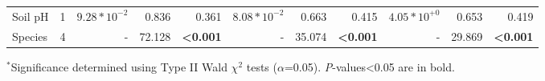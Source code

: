 \begin{landscape}
\begin{table}[]
{\begin{tabular}{p{2.5cm}p{0.5cm}p{2cm}p{1.5cm}p{1.5cm}p{2cm}p{1.5cm}p{1.5cm}p{2cm}p{1.5cm}p{1.5cm}}
                 Soil pH & \multicolumn{1}{r}{1}
                 & \multicolumn{1}{r}{$9.28*10^{-2}$} & \multicolumn{1}{r}{0.836} & \multicolumn{1}{r}{0.361}
                 & \multicolumn{1}{r}{$8.08*10^{-2}$} & \multicolumn{1}{r}{0.663} & \multicolumn{1}{r}{0.415}
                 & \multicolumn{1}{r}{$4.05*10^{+0}$} & \multicolumn{1}{r}{0.653} & \multicolumn{1}{r}{0.419} 
                 \\

                 Species & \multicolumn{1}{r}{4}
                 & \multicolumn{1}{r}{-} & \multicolumn{1}{r}{72.128} &  \multicolumn{1}{r}{\textbf{\textless{}0.001}}
                 & \multicolumn{1}{r}{-} & \multicolumn{1}{r}{35.074} &  \multicolumn{1}{r}{\textbf{\textless{}0.001}}
                 & \multicolumn{1}{r}{-} & \multicolumn{1}{r}{29.869} &  \multicolumn{1}{r}{\textbf{\textless{}0.001}}
                 \\
                 \hline

    \end{tabular}}
    \label{tab:table3.1}
\end{table}
\begin{singlespace}
    \noindent $^*$Significance determined using Type II Wald $\chi^{2}$ tests ($\alpha$=0.05). \textit{P}-values<0.05 are in bold.       
\end{singlespace}
\end{landscape}
\clearpage

